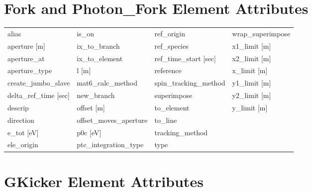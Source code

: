  \section{Fork and Photon_Fork Element Attributes}
 \label{s:list.fork}
 
 \begin{tabular}{llll} \toprule
alias                            & is_on                            & ref_origin                       & wrap_superimpose                 \\
aperture [m]                     & ix_to_branch                     & ref_species                      & x1_limit [m]                     \\
aperture_at                      & ix_to_element                    & ref_time_start [sec]             & x2_limit [m]                     \\
aperture_type                    & l [m]                            & reference                        & x_limit [m]                      \\
create_jumbo_slave               & mat6_calc_method                 & spin_tracking_method             & y1_limit [m]                     \\
delta_ref_time [sec]             & new_branch                       & superimpose                      & y2_limit [m]                     \\
descrip                          & offset [m]                       & to_element                       & y_limit [m]                      \\
direction                        & offset_moves_aperture            & to_line                          &                                  \\
e_tot [eV]                       & p0c [eV]                         & tracking_method                  &                                  \\
ele_origin                       & ptc_integration_type             & type                             &                                  \\
 \bottomrule
 \end{tabular}
 \vfill
 
 \section{GKicker Element Attributes}
 \label{s:list.gkicker}
 
